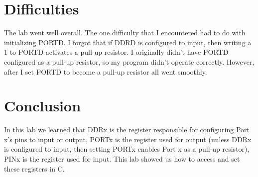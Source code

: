 \documentclass[12pt,letterpaper]{article}
\begin{document}
\section{Difficulties}
The lab went well overall.
The one difficulty that I encountered had to do with initializing PORTD.
I forgot that if DDRD is configured to input, then writing a 1 to PORTD activates a pull-up resistor.
I originally didn't have PORTD configured as a pull-up resistor, so my program didn't operate correctly.
However, after I set PORTD to become a pull-up resistor all went smoothly.

\section{Conclusion}
In this lab we learned that DDRx is the register responsible for configuring Port x's pins to input or output, PORTx is the register used for output (unless DDRx is configured to input, then setting PORTx enables Port x as a pull-up resistor), PINx is the register used for input.
This lab showed us how to access and set these registers in C.
\end{document}
